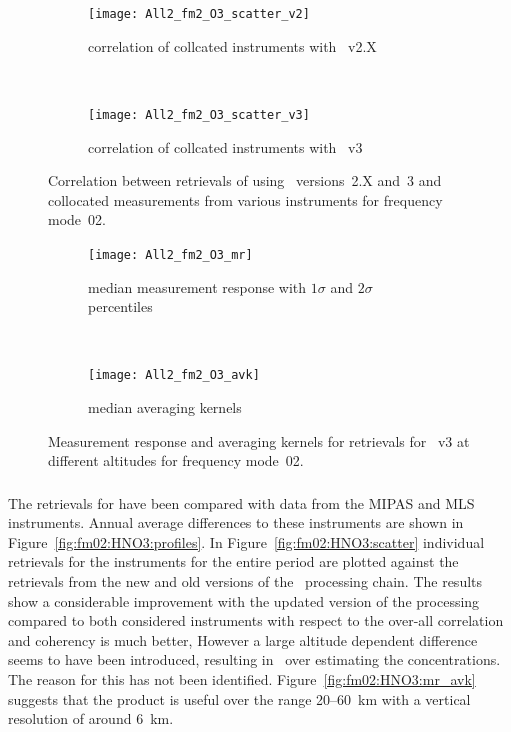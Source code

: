 \begin{figure}[tbhp]
    \centering
    \begin{subfigure}[b]{0.49\textwidth}
        \texttt{[image: All2\_fm2\_O3\_scatter\_v2]}
        \caption{correlation of collcated instruments with \smr~v2.X}
        \label{fig:fm02:O3:scatter:v2}
    \end{subfigure}
    \,
    \begin{subfigure}[b]{0.49\textwidth}
        \texttt{[image: All2\_fm2\_O3\_scatter\_v3]}
        \caption{correlation of collcated instruments with \smr~v3}
        \label{fig:fm02:O3:scatter:v3}
    \end{subfigure}
    \caption{Correlation between retrievals of  using \smr\
    versions~2.X and~3 and collocated measurements from various instruments
    for frequency mode~02.}
    \label{fig:fm02:O3:scatter}
\end{figure}

\begin{figure}[tbhp]
    \centering
    \begin{subfigure}[b]{0.49\textwidth}
        \texttt{[image: All2\_fm2\_O3\_mr]}
        \caption{median measurement response with $1\sigma$ and $2\sigma$
        percentiles}
        \label{fig:fm02:O3:mr}
    \end{subfigure}
    \,
    \begin{subfigure}[b]{0.49\textwidth}
        \texttt{[image: All2\_fm2\_O3\_avk]}
        \caption{median averaging kernels\newline~}
        \label{fig:fm02:O3:avk}
    \end{subfigure}
    \caption{Measurement response and averaging kernels for 
    retrievals for \smr~v3 at different altitudes for frequency mode~02.}
    \label{fig:fm02:O3:mr_avk}
\end{figure}



\subsubsection{}
\label{sec:fm02:comparison:HNO3} The retrievals for  have been
compared with data from the MIPAS and MLS instruments. Annual average
differences to these instruments are shown in
Figure~\ref{fig:fm02:HNO3:profiles}. In Figure~\ref{fig:fm02:HNO3:scatter}
individual retrievals for the instruments for the entire period are plotted
against the retrievals from the new and old versions of the \smr\ processing
chain. The results show a considerable improvement with the updated version of
the processing compared to both considered instruments with respect to the
over-all correlation and coherency is much better, However a large altitude
dependent difference seems to have been introduced, resulting in \smr\ over
estimating the concentrations. The reason for this has not been identified.
Figure~\ref{fig:fm02:HNO3:mr_avk} suggests that the product is useful over the
range 20--60~km with a vertical resolution of around 6~km.


